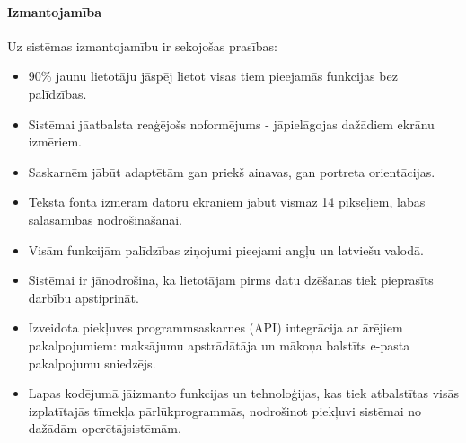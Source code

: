 \paragraph{Izmantojamība}

Uz sistēmas izmantojamību ir sekojošas prasības:

\begin{itemize}
	\item 90\% jaunu lietotāju jāspēj lietot visas tiem pieejamās funkcijas bez palīdzības.
	\item Sistēmai jāatbalsta reaģējošs noformējums - jāpielāgojas dažādiem ekrānu izmēriem.
	\item Saskarnēm jābūt adaptētām gan priekš ainavas, gan portreta orientācijas.
	\item Teksta fonta izmēram datoru ekrāniem jābūt vismaz 14 pikseļiem, labas salasāmības nodrošināšanai.
	\item Visām funkcijām palīdzības ziņojumi pieejami angļu un latviešu valodā.
	\item Sistēmai ir jānodrošina, ka lietotājam pirms datu dzēšanas tiek pieprasīts darbību apstiprināt.
	\item Izveidota piekļuves programmsaskarnes (API) integrācija ar ārējiem pakalpojumiem: maksājumu apstrādātāja un mākoņa balstīts e-pasta pakalpojumu sniedzējs.
	\item Lapas kodējumā jāizmanto funkcijas un tehnoloģijas, kas tiek atbalstītas visās izplatītajās tīmekļa pārlūkprogrammās, nodrošinot piekļuvi sistēmai no dažādām operētājsistēmām.
\end{itemize}
